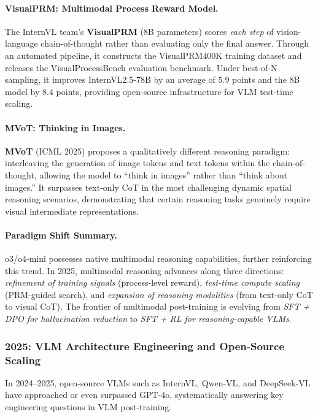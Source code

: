 \paragraph{VisualPRM: Multimodal Process Reward Model.}
The InternVL team's \textbf{VisualPRM} \cite{wang2025visualprm} (8B parameters)
scores \textit{each step} of vision-language chain-of-thought rather than evaluating only the final answer.
Through an automated pipeline, it constructs the VisualPRM400K training dataset and releases the VisualProcessBench evaluation benchmark.
Under best-of-N sampling, it improves InternVL2.5-78B by an average of 5.9 points and the 8B model by 8.4 points,
providing open-source infrastructure for VLM test-time scaling.

\paragraph{MVoT: Thinking in Images.}
\textbf{MVoT} \cite{li2025mvot} (ICML 2025) proposes a qualitatively different reasoning paradigm:
interleaving the generation of image tokens and text tokens within the chain-of-thought,
allowing the model to ``think in images'' rather than ``think about images.''
It surpasses text-only CoT in the most challenging dynamic spatial reasoning scenarios,
demonstrating that certain reasoning tasks genuinely require visual intermediate representations.

\paragraph{Paradigm Shift Summary.}
o3/o4-mini \cite{openai2025o3} possesses native multimodal reasoning capabilities, further reinforcing this trend.
In 2025, multimodal reasoning advances along three directions:
\textit{refinement of training signals} (process-level reward),
\textit{test-time compute scaling} (PRM-guided search),
and \textit{expansion of reasoning modalities} (from text-only CoT to visual CoT).
The frontier of multimodal post-training is evolving from
\textit{SFT + DPO for hallucination reduction}
to \textit{SFT + RL for reasoning-capable VLMs}.

\subsubsection{2025: VLM Architecture Engineering and Open-Source Scaling}
\label{sec:t5-scaling}

In 2024--2025, open-source VLMs such as InternVL, Qwen-VL, and DeepSeek-VL have approached or even surpassed GPT-4o,
systematically answering key engineering questions in VLM post-training.

